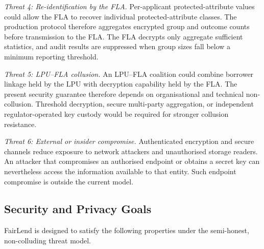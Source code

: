\documentclass[a4paper,fleqn]{cas-dc}
\begin{document}
\textit{Threat 4: Re-identification by the FLA.} Per-applicant protected-attribute values could allow the FLA to recover individual protected-attribute classes. The production protocol therefore aggregates encrypted group and outcome counts before transmission to the FLA. The FLA decrypts only aggregate sufficient statistics, and audit results are suppressed when group sizes fall below a minimum reporting threshold. 

\textit{Threat 5: LPU--FLA collusion.} An LPU--FLA coalition could combine borrower linkage held by the LPU with decryption capability held by the FLA. The present security guarantee therefore depends on organisational and technical non-collusion. Threshold decryption, secure multi-party aggregation, or independent regulator-operated key custody would be required for stronger collusion resistance. 

\textit{Threat 6: External or insider compromise.} Authenticated encryption and secure channels reduce exposure to network attackers and unauthorised storage readers. An attacker that compromises an authorised endpoint or obtains a secret key can nevertheless access the information available to that entity. Such endpoint compromise is outside the current model.

\subsection{Security and Privacy Goals} 
\label{subsec:security_goals} 

FairLend is designed to satisfy the following properties under the semi-honest, non-colluding threat model. 
\end{document}
